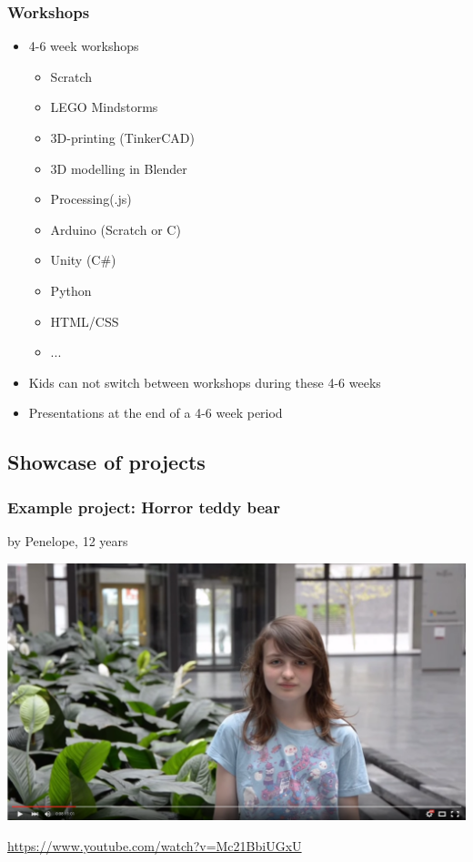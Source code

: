 \documentclass{beamer}
\begin{document}
\begin{frame}
\frametitle{Workshops}

\begin{itemize}
\item 4-6 week workshops
  \begin{itemize}
  \item Scratch
  \item LEGO Mindstorms
  \item 3D-printing (TinkerCAD)
  \item 3D modelling in Blender
  \item Processing(.js)
  \item Arduino (Scratch or C)
  \item Unity (C\#)
  \item Python
  \item HTML/CSS
  \item ...
  \end{itemize}
\item Kids can not switch between workshops during these 4-6 weeks
\item Presentations at the end of a 4-6 week period
\end{itemize}


\end{frame}

\subsection{Showcase of projects}

\begin{frame}
  \frametitle{Example project: Horror teddy bear}
  by Penelope, 12 years
  \vspace{7mm}

  \includegraphics[width=\textwidth]{imagery/penelope-raedselsbamse}

  \url{https://www.youtube.com/watch?v=Mc21BbiUGxU}
\end{frame}
\end{document}
